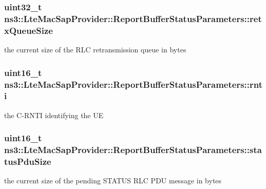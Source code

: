 \subsubsection[{\texorpdfstring{retx\+Queue\+Size}{retxQueueSize}}]{\setlength{\rightskip}{0pt plus 5cm}uint32\+\_\+t ns3\+::\+Lte\+Mac\+Sap\+Provider\+::\+Report\+Buffer\+Status\+Parameters\+::retx\+Queue\+Size}\hypertarget{structns3_1_1LteMacSapProvider_1_1ReportBufferStatusParameters_ab15272117ca5d60ec639c0f569c91cea}{}\label{structns3_1_1LteMacSapProvider_1_1ReportBufferStatusParameters_ab15272117ca5d60ec639c0f569c91cea}
the current size of the R\+LC retransmission queue in bytes 
\subsubsection[{\texorpdfstring{rnti}{rnti}}]{\setlength{\rightskip}{0pt plus 5cm}uint16\+\_\+t ns3\+::\+Lte\+Mac\+Sap\+Provider\+::\+Report\+Buffer\+Status\+Parameters\+::rnti}\hypertarget{structns3_1_1LteMacSapProvider_1_1ReportBufferStatusParameters_ad6094943fa81732abf28f50ee862f85f}{}\label{structns3_1_1LteMacSapProvider_1_1ReportBufferStatusParameters_ad6094943fa81732abf28f50ee862f85f}
the C-\/\+R\+N\+TI identifying the UE 
\subsubsection[{\texorpdfstring{status\+Pdu\+Size}{statusPduSize}}]{\setlength{\rightskip}{0pt plus 5cm}uint16\+\_\+t ns3\+::\+Lte\+Mac\+Sap\+Provider\+::\+Report\+Buffer\+Status\+Parameters\+::status\+Pdu\+Size}\hypertarget{structns3_1_1LteMacSapProvider_1_1ReportBufferStatusParameters_ae3551a3576f0ebbad92f1fed5c31a065}{}\label{structns3_1_1LteMacSapProvider_1_1ReportBufferStatusParameters_ae3551a3576f0ebbad92f1fed5c31a065}
the current size of the pending S\+T\+A\+T\+US R\+LC P\+DU message in bytes 
